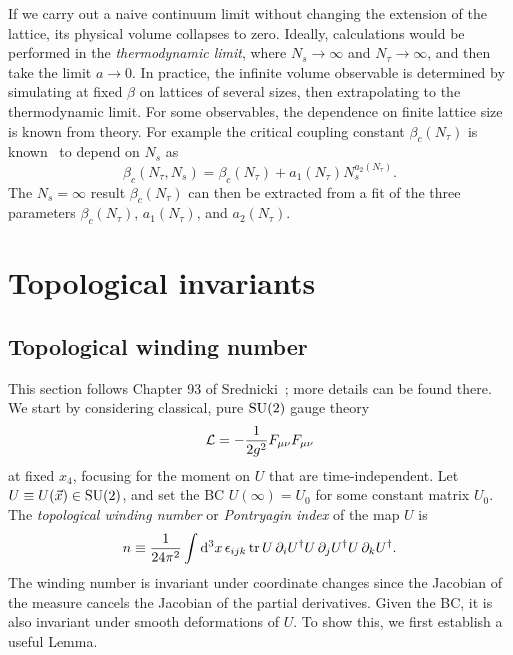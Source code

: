 If we carry out a naive continuum limit without changing the
extension of the lattice, its physical volume collapses to zero.
Ideally, calculations would be performed in 
 the {\it thermodynamic limit},
where $N_s\to\infty$ and $N_\tau\to\infty$, and then take the limit
$a\to0$. In practice, the infinite volume observable is determined
by simulating at fixed $\beta$ on lattices of several sizes, then
extrapolating to the thermodynamic limit.
For some observables, the dependence on finite lattice size is known
from theory. For example the critical coupling constant $\beta_c(N_\tau)$
is known~\cite{engels_critical_1996} to depend on $N_s$ as
\begin{equation}
  \beta_c(N_\tau,N_s)=\beta_c(N_\tau)+a_1(N_\tau)N_s^{a_2(N_\tau)}.
\end{equation}
The $N_s=\infty$ result $\beta_c(N_\tau)$ can then
be extracted from a fit of the three parameters $\beta_c(N_\tau)$,
$a_1(N_\tau)$, and $a_2(N_\tau)$.


\section{Topological invariants}\label{sec:topinvar}


\subsection{Topological winding number}

This section follows Chapter 93 of Srednicki~\cite{srednicki_quantum_2007}; 
more details can be found there.
We start by considering classical, pure $\operatorname{SU}(2)$ gauge theory
\begin{equation}\label{eq:topaction}
  \mathcal{L}=-\frac{1}{2g^2}F_{\mu\nu}F_{\mu\nu}
\end{equation}
at fixed $x_4$, focusing for the moment on $U$ that are time-independent.
Let $U\equiv U(\vec{x})\in\operatorname{SU}(2)$, and set the BC $U(\infty)=U_0$
for some constant matrix $U_0$. 
The {\it topological winding number} 
or {\it Pontryagin index} of the map $U$ is
\begin{equation}\label{eq:wn}
  n\equiv\frac{1}{24\pi^2}\int\dd[3]{x}\epsilon_{ijk}
    \tr U\,\partial_iU^\dagger U\,\partial_jU^\dagger
        U\,\partial_kU^\dagger.
\end{equation}
The winding number is invariant under coordinate changes since the Jacobian of
the measure cancels the Jacobian of the partial derivatives.
Given the BC, it is also invariant under smooth deformations of $U$. 
To show this, we first establish a useful Lemma.


